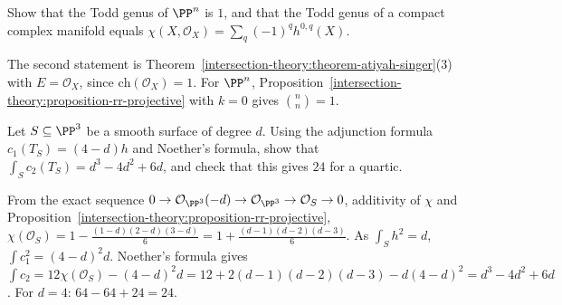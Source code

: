 \begin{exercise}\label{intersection-theory:exercise-todd-genus}
Show that the Todd genus of $\PP^n$ is $1$, and that the Todd genus of a compact complex manifold equals $\chi(X, \mathcal{O}_X) = \sum_q(-1)^qh^{0,q}(X)$.
\end{exercise}

\begin{solution}
The second statement is Theorem~\ref{intersection-theory:theorem-atiyah-singer}(3) with $E = \mathcal{O}_X$, since $\mathrm{ch}(\mathcal{O}_X) = 1$. For $\PP^n$, Proposition~\ref{intersection-theory:proposition-rr-projective} with $k = 0$ gives
$\binom{n}{n} = 1$.
\end{solution}

\begin{exercise}\label{intersection-theory:exercise-hypersurface-euler}
Let $S \subseteq \PP^3$ be a smooth surface of degree $d$. Using the adjunction formula $c_1(T_S) = (4 - d)h$ and Noether's formula, show that $\int_Sc_2(T_S) = d^3 - 4d^2 + 6d$, and check that this gives $24$ for a quartic.
\end{exercise}

\begin{solution}
From the exact sequence $0 \to \mathcal{O}_{\PP^3}(-d) \to \mathcal{O}_{\PP^3} \to \mathcal{O}_S \to 0$, additivity of $\chi$ and Proposition~\ref{intersection-theory:proposition-rr-projective},
$\chi(\mathcal{O}_S) = 1 - \frac{(1 - d)(2 - d)(3 - d)}{6} = 1 + \frac{(d - 1)(d - 2)(d - 3)}{6}$. As
$\int_Sh^2 = d$, $\int c_1^2 = (4 - d)^2d$. Noether's formula gives $\int c_2 = 12\chi(\mathcal{O}_S) - (4 - d)^2d = 12 + 2(d - 1)(d - 2)(d - 3) - d(4 - d)^2 = d^3 - 4d^2 + 6d$. For $d = 4$: $64 - 64 + 24 = 24$.
\end{solution}
